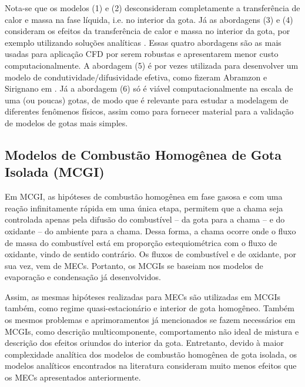 Nota-se que os modelos (1) e (2) desconsideram completamente a transferência de calor e massa na fase líquida, i.e. no interior da gota.
Já as abordagens (3) e (4) consideram os efeitos da transferência de calor e massa no interior da gota, por exemplo utilizando soluções analíticas \cite{ZanuttoC2019}.
Essas quatro abordagens são as mais usadas para aplicação CFD por serem robustas e apresentarem menor custo computacionalmente. 
A abordagem (5) é por vezes utilizada para desenvolver um modelo de condutividade/difusividade efetiva, como fizeram Abramzon e Sirignano em \cite{Sirignano1989}.
Já a abordagem (6) só é viável computacionalmente na escala de uma (ou poucas) gotas, de modo que é relevante para estudar a modelagem de diferentes fenômenos físicos, assim como para fornecer material para a validação de modelos de gotas mais simples.



\subsection{Modelos de Combustão Homogênea de Gota Isolada (MCGI)} \label{sec:MCGI}

Em MCGI, as hipóteses de combustão homogênea em fase gasosa e com uma reação infinitamente rápida em uma única etapa, permitem que a chama seja controlada apenas pela difusão do combustível -- da gota para a chama -- e do oxidante -- do ambiente para a chama.
Dessa forma, a chama ocorre onde o fluxo de massa do combustível está em proporção estequiométrica com o fluxo de oxidante, vindo de sentido contrário. 
Os fluxos de combustível e de oxidante, por sua vez, vem de MECs.
Portanto, os MCGIs se baseiam nos modelos de evaporação e condensação já desenvolvidos.

Assim, as mesmas hipóteses realizadas para MECs são utilizadas em MCGIs também, como regime quasi-estacionário e interior de gota homogêneo.
Também os mesmos problemas e aprimoramentos já mencionados se fazem necessários em MCGIs, como descrição multicomponente, comportamento não ideal de mistura e  
descrição dos efeitos oriundos do interior da gota.
Entretanto, devido à maior complexidade analítica dos modelos de combustão homogênea de gota isolada, os modelos analíticos encontrados na literatura consideram muito menos efeitos que os MECs apresentados anteriormente.

